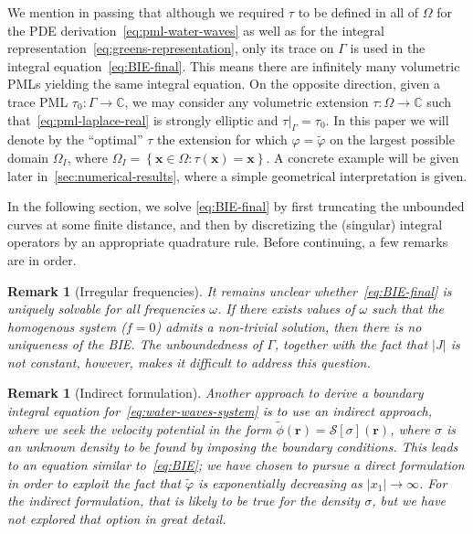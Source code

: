 \documentclass[11pt]{article}
\newcommand{\C}{\mathbb{C}}
\newcommand{\bx}{\mathbf{x}}
\newcommand{\br}{\boldsymbol{r}}
\newcommand{\tvarphi}{\tilde \varphi}
\newtheorem{remark}[theorem]{Remark}
\begin{document}
We mention in passing that although we required $\tau$ to be defined in all of
$\Omega$ for the PDE derivation~\cref{eq:pml-water-waves} as well as for the
integral representation~\cref{eq:greens-representation}, only its trace on
$\Gamma$ is used in the integral equation~\cref{eq:BIE-final}. This means there
are infinitely many volumetric PMLs yielding the same integral equation. On the
opposite direction, given a trace PML $\tau_0 : \Gamma \to \C$, we may consider
any volumetric extension $\tau : \Omega \to \C$ such
that~\cref{eq:pml-laplace-real} is strongly elliptic and $\tau|_{\Gamma} =
\tau_0$. In this paper we will denote by the ``optimal'' $\tau$ the extension
for which $\varphi = \tvarphi$ on the largest possible domain $\Omega_I$, where
$\Omega_I = \left\{ \bx \in \Omega : \tau(\bx) = \bx \right\}$. A concrete
example will be given later in~\cref{sec:numerical-results}, where a simple
geometrical interpretation is given.

In the following section, we solve \cref{eq:BIE-final} by first truncating the
unbounded curves at some finite distance, and then by discretizing the
(singular) integral operators by an appropriate quadrature rule. Before
continuing, a few remarks are in order. 

\begin{remark}[Irregular frequencies]
  It remains unclear whether~\cref{eq:BIE-final} is uniquely solvable for all
  frequencies $\omega$. If there exists values of $\omega$ such that the
  homogenous system ($f=0$) admits a non-trivial solution, then there is no
  uniqueness of the BIE. The unboundedness of $\Gamma$, together with the fact
  that $|J|$ is not constant, however, makes it difficult to address this
  question.
\end{remark}

\begin{remark}[Indirect formulation]
  Another approach to derive a boundary integral equation
  for~\cref{eq:water-waves-system} is to use an \emph{indirect} approach, where
  we seek the velocity potential in the form $\tilde{\phi}(\br) =
  \mathcal{S}[\sigma](\br)$, where $\sigma$ is an unknown density to be found by
  imposing the boundary conditions. This leads to an equation similar
  to~\cref{eq:BIE}; we have chosen to pursue a \emph{direct} formulation in
  order to exploit the fact that $\tvarphi$ is exponentially decreasing as
  $|x_1| \to \infty$. For the indirect formulation, that is likely to be true
  for the density $\sigma$, but we have not explored that option in great
  detail. 
\end{remark}
\end{document}
